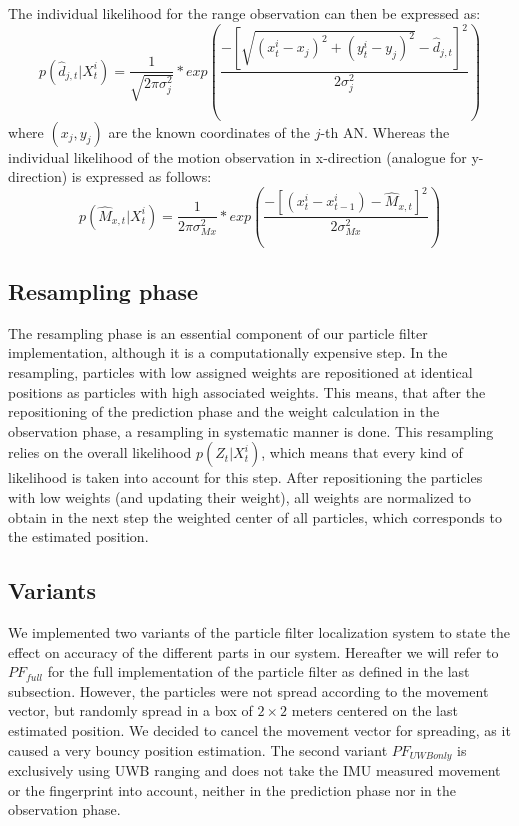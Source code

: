 The individual likelihood for the range observation can then be expressed as:
$$p(\hat{d}_{j,t} | X^{i}_{t}) = \frac{1}{\sqrt{2\pi \sigma_{j}^{2}}} * exp(\frac{-[\sqrt{(x^{i}_{t}-x_{j})^{2}+(y^{i}_{t}-y_{j})^{2}} - \hat{d}_{j,t}]^{2}}{2\sigma_{j}^{2}})$$
where $(x_{j},y_{j})$ are the known coordinates of the $j$-th AN.
Whereas the individual likelihood of the motion observation in x-direction (analogue for y-direction) is expressed as follows:
$$p(\hat{M}_{x,t} | X^{i}_{t}) = \frac{1}{2\pi \sigma_{Mx}^{2}} * exp(\frac{-[(x^{i}_{t}-x^{i}_{t-1}) - \hat{M}_{x,t}]^{2}}{2\sigma_{Mx}^{2}})$$

\subsection{Resampling phase}
The resampling phase is an essential component of our particle filter implementation, although it is a computationally expensive step. In the resampling, particles with low assigned weights are repositioned at identical positions as particles with high associated weights. This means, that after the repositioning of the prediction phase and the weight calculation in the observation phase, a resampling in systematic manner is done. This resampling relies on the overall likelihood $p(Z_{t} | X^{i}_{t})$, which means that every kind of likelihood is taken into account for this step. After repositioning the particles with low weights (and updating their weight), all weights are normalized to obtain in the next step the weighted center of all particles, which corresponds to the estimated position. 
\subsection{Variants}
We implemented two variants of the particle filter localization system to state the effect on accuracy of the different parts in our system.
Hereafter we will refer to $PF_{full}$ for the full implementation of the particle filter as defined in the last subsection. However, the particles were not spread according to the movement vector, but randomly spread in a box of $2 \times 2$ meters centered on the last estimated position. We decided to cancel the movement vector for spreading, as it caused a very bouncy position estimation.
The second variant $PF_{UWBonly}$ is exclusively using UWB ranging and does not take the IMU measured movement or the fingerprint into account, neither in the prediction phase nor in the observation phase. 


